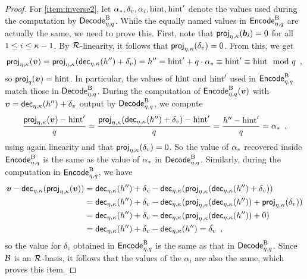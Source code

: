 \begin{proof}
\bigskip\noindent
For \autoref{item:inverse2}, let $\alpha_{\ast}, \delta_v, \alpha_i, \mathrm{hint}, \mathrm{hint}'$ denote the values used during the computation by $\mathsf{Decode}^{\textup{B}}_{\eta,q}$.
While the equally named values in $\mathsf{Encode}^{\textup{B}}_{\eta,q}$ are actually the same, we need to prove this.
First, note that $\mathsf{proj}_{\eta,\kappa}(\boldsymbol{b}_i) = 0$ for all $1\leq i \leq \kappa-1$.
By $\mathcal{R}$-linearity, it follows that $\mathsf{proj}_{\eta,\kappa}(\delta_v) = 0$. From this, we get
\[
 \mathsf{proj}_{\eta,\kappa}(\boldsymbol{v}) = \mathsf{proj}_{\eta,\kappa}(\mathsf{dec}_{\eta,\kappa}(h'') + \delta_v) = h'' = \mathrm{hint}' + q\cdot \alpha_{\ast} \equiv \mathrm{hint}' \equiv \mathrm{hint} \mod q\enspace,
\]
so $\mathsf{proj}_{q}(\boldsymbol{v}) = \mathrm{hint}$. In particular, the values of $\mathrm{hint}$ and $\mathrm{hint}'$ used in $\mathsf{Encode}^{\textup{B}}_{\eta,q}$ match those in $\mathsf{Decode}^{\textup{B}}_{\eta,q}$.
During the computation of $\mathsf{Encode}^{\textup{B}}_{\eta,q}(\boldsymbol{v})$ with $\boldsymbol{v} = \mathsf{dec}_{\eta,\kappa}(h'')+\delta_v$ output by $\mathsf{Decode}^{\textup{B}}_{\eta,q}$, we compute
\[
 \frac{\mathsf{proj}_{\eta,\kappa}(\boldsymbol{v}) - \mathrm{hint}'}{q} = \frac{\mathsf{proj}_{\eta,\kappa}(\mathsf{dec}_{\eta,\kappa}(h'')+\delta_v)-\mathrm{hint}'}{q} = \frac{h''-\mathrm{hint}'}{q} = \alpha_{\ast}\enspace,
\]
using again linearity and that $\mathsf{proj}_{\eta,\kappa}(\delta_v) = 0$.
So the value of $\alpha_{\ast}$ recovered inside $\mathsf{Encode}^{\textup{B}}_{\eta,q}$ is the same as the value of $\alpha_{\ast}$ in $\mathsf{Decode}^{\textup{B}}_{\eta,q}$.
Similarly, during the computation in $\mathsf{Encode}^{\textup{B}}_{\eta,q}$, we have
\begin{align*}
 \boldsymbol{v}-\mathsf{dec}_{\eta,\kappa}(\mathsf{proj}_{\eta,\kappa}(\boldsymbol{v})) 
 ={}& \mathsf{dec}_{\eta,\kappa}(h'') + \delta_v - \mathsf{dec}_{\eta,\kappa}(\mathsf{proj}_{\eta,\kappa}(\mathsf{dec}_{\eta,\kappa}(h'')+\delta_v))\\
 ={}& \mathsf{dec}_{\eta,\kappa}(h'') + \delta_v - \mathsf{dec}_{\eta,\kappa}(\mathsf{proj}_{\eta,\kappa}(\mathsf{dec}_{\eta,\kappa}(h''))+\mathsf{proj}_{\eta,\kappa}(\delta_v))\\
 ={}& \mathsf{dec}_{\eta,\kappa}(h'') + \delta_v - \mathsf{dec}_{\eta,\kappa}(\mathsf{proj}_{\eta,\kappa}(\mathsf{dec}_{\eta,\kappa}(h''))+ 0)\\
 ={}&\mathsf{dec}_{\eta,\kappa}(h'') + \delta_v - \mathsf{dec}_{\eta,\kappa}(h'') = \delta_v\enspace,
\end{align*}
so the value for $\delta_v$ obtained in $\mathsf{Encode}^{\textup{B}}_{\eta,q}$ is the same as that in $\mathsf{Decode}^{\textup{B}}_{\eta,q}$.
Since $\mathcal{B}$ is an $\mathcal{R}$-basis, it follows that the values of the $\alpha_i$ are also the same, which proves this item.


\end{proof}
